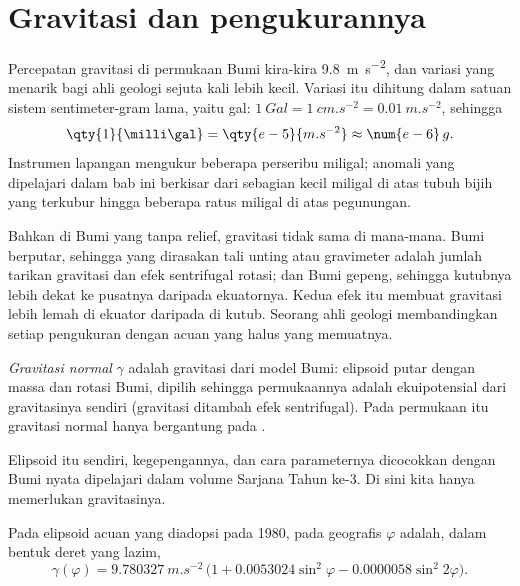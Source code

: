 \section{Gravitasi dan pengukurannya}

Percepatan gravitasi di permukaan Bumi kira-kira \qty{9.8}{m.s^{-2}}, dan variasi yang menarik bagi ahli geologi sejuta kali lebih kecil. Variasi itu dihitung dalam satuan sistem sentimeter-gram lama, yaitu gal: $\qty{1}{Gal} = \qty{1}{cm.s^{-2}} = \qty{0.01}{m.s^{-2}}$, sehingga
\[
  \qty{1}{\milli\gal} = \qty{e-5}{m.s^{-2}} \approx \num{e-6}\,g .
\]
Instrumen lapangan mengukur beberapa perseribu miligal; anomali yang dipelajari dalam bab ini berkisar dari sebagian kecil miligal di atas tubuh bijih yang terkubur hingga beberapa ratus miligal di atas pegunungan.

Bahkan di Bumi yang tanpa relief, gravitasi tidak sama di mana-mana. Bumi berputar, sehingga yang dirasakan tali unting atau gravimeter adalah jumlah tarikan gravitasi dan efek sentrifugal rotasi; dan Bumi gepeng, sehingga kutubnya lebih dekat ke pusatnya daripada ekuatornya. Kedua efek itu membuat gravitasi lebih lemah di ekuator daripada di kutub. Seorang ahli geologi membandingkan setiap pengukuran dengan acuan yang halus yang memuatnya.

\begin{definition}\label{def:b1:isostasy-gravity:normal-gravity}
\emph{Gravitasi normal} $\gamma$ adalah gravitasi dari model Bumi: elipsoid putar dengan massa dan rotasi Bumi, dipilih sehingga permukaannya adalah ekuipotensial dari gravitasinya sendiri (gravitasi ditambah efek sentrifugal). Pada permukaan itu gravitasi normal hanya bergantung pada .
\end{definition}

Elipsoid itu sendiri, kegepengannya, dan cara parameternya dicocokkan dengan Bumi nyata dipelajari dalam volume Sarjana Tahun ke-3. Di sini kita hanya memerlukan gravitasinya.

\begin{proposition}\label{prop:b1:isostasy-gravity:normal-formula}
Pada elipsoid acuan yang diadopsi pada 1980,  pada  geografis $\varphi$ adalah, dalam bentuk deret yang lazim,
\[
  \gamma(\varphi) = \qty{9.780327}{m.s^{-2}}\,\bigl(1 + 0.0053024\sin^2\varphi
  - 0.0000058\sin^2 2\varphi\bigr).
\]
\end{proposition}
\admitted

